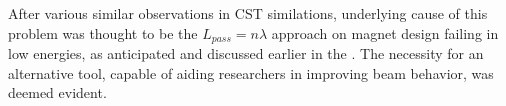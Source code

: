 \documentclass[a4paper,oneside,12pt]{report}
\numberwithin{equation}{chapter}
\begin{document}
After various similar observations in CST similations, underlying cause of this problem was thought to be the $L_{pass} = n \lambda$ approach on magnet design failing in low energies, 
as anticipated and discussed earlier in the .
The necessity for an alternative tool, capable of aiding researchers in improving beam behavior, was deemed evident.

\end{document}
